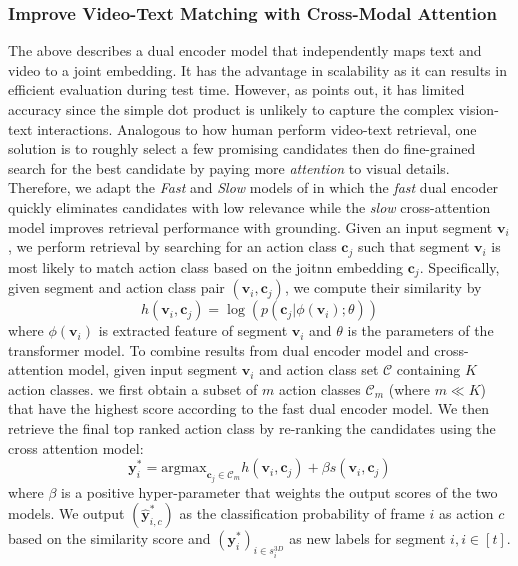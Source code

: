 \subsubsection{Improve Video-Text Matching with Cross-Modal Attention}
The above describes a dual encoder model that independently maps text and video to a joint embedding. It has the advantage in scalability as it can results in efficient evaluation during test time. However, as  points out, it has limited accuracy since the simple dot product is unlikely to capture the complex vision-text interactions. Analogous to how human perform video-text retrieval, one solution is to roughly select a few promising candidates then do fine-grained search for the best candidate by paying more \emph{attention} to visual details. Therefore, we adapt the \emph{Fast} and \emph{Slow} models of  in which the \emph{fast} dual encoder quickly eliminates candidates with low relevance while the \emph{slow} cross-attention model improves retrieval performance with grounding. Given an input segment $\mathbf{v}_i$, we perform retrieval by searching for an action class $\mathbf{c}_j$ such that segment $\mathbf{v}_i$ is most likely to match action class based on the joitnn embedding $\mathbf{c}_j$. Specifically, given segment and action class pair $(\mathbf{v}_i, \mathbf{c}_j)$, we compute their similarity by \[
    h(\mathbf{v}_i, \mathbf{c}_j) = \log (p(\mathbf{c}_j|\phi(\mathbf{v}_i);\theta))
\]
where $\phi(\mathbf{v}_i)$ is extracted feature of segment $\mathbf{v}_i$ and $\theta$ is the parameters of the transformer model. To combine results from dual encoder model and cross-attention model, given input segment $\mathbf{v}_i$ and action class set $\mathcal{C}$ containing $K$ action classes. we first obtain a subset of $m$ action classes $\mathcal{C}_m$ (where $m \ll K$) that have the highest score according to the fast dual encoder model. We then retrieve the final top ranked action class by re-ranking the candidates using the cross attention model:
\[
    \mathbf{y}^*_i=\text{argmax}_{\mathbf{c}_j\in \mathcal{C}_m} h(\mathbf{v}_i, \mathbf{c}_j) + \beta s(\mathbf{v}_i,\mathbf{c}_j)
\]
where $\beta$ is a positive hyper-parameter that weights the output scores of the two models. We output $(\hat{\mathbf{y}}^*_{i,c})$ as the classification probability of frame $i$ as action $c$ based on the similarity score and $(\mathbf{y}^*_i)_{i\in s_i^{3D}}$ as new labels for segment $i,i\in[t]$.
